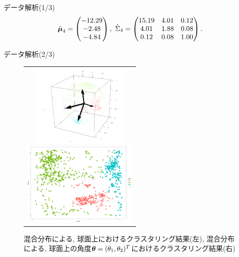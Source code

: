\documentclass[dvipdfmx]{beamer} %
\newcommand{\bm}[1]{\mbox{\boldmath $#1$}}
\begin{document}
\begin{frame}{データ解析(1/3)}
\begin{equation}
\begin{split}
\hat{\bm \mu}_4 = \begin{pmatrix} -12.29   \\ -2.48 \\ -4.84 \\ \end{pmatrix},\ 
\hat \Sigma_4 = \begin{pmatrix} 15.19 & 4.01 &  0.12 \\ 4.01 & 1.88 & 0.08 \\ 0.12 & 0.08 &1.00 \\ \end{pmatrix}.
\end{split}
\end{equation}
\normalsize
\end{frame}


\begin{frame}{データ解析(2/3)}

\vspace{-1zh}
\begin{figure}[H]
\begin{tabular}{c}

\begin{minipage}{0.5\hsize}
\begin{center}
\includegraphics[clip,height= 40mm]{data/cluster_3d.png}
\end{center}
\end{minipage}

\begin{minipage}{0.5\hsize}
\begin{center}
\includegraphics[clip,height= 40mm]{data/cluster_4.png}
\end{center}
\end{minipage}

\end{tabular}
\label{fig2}
\caption{混合分布による, 球面上におけるクラスタリング結果(左), 混合分布による, 球面上の角度$\bm \theta = (\theta_1, \theta_2)^T$におけるクラスタリング結果(右)}
\end{figure}
\end{frame}
\end{document}
